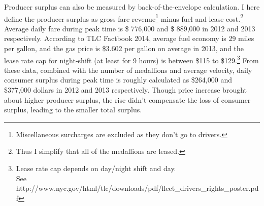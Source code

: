 Producer surplus can also be measured by back-of-the-envelope calculation. I here define the producer surplus as gross fare revenue\footnote{Miscellaneous surcharges are excluded as they don't go to drivers.} minus fuel and lease cost.\footnote{Thus I simplify that all of the medallions are leased.} Average daily fare during peak time is \$ 776,000 and \$ 889,000 in 2012 and 2013 respectively. According to TLC Factbook 2014, average fuel economy is 29 miles per gallon, and the gas price is \$3.602 per gallon on average in 2013, and the lease rate cap for night-shift (at least for 9 hours) is between \$115 to \$129.\footnote{Lease rate cap depends on day/night shift and day. \\See http://www.nyc.gov/html/tlc/downloads/pdf/fleet\_drivers\_rights\_poster.pdf } From these data, combined with the number of medallions and average velocity, daily consumer surplus during peak time is roughly calculated as \$264,000 and \$377,000 dollars in 2012 and 2013 respectively. Though price increase brought about higher producer surplus, the rise didn't compensate the loss of consumer surplus, leading to the smaller total surplus.